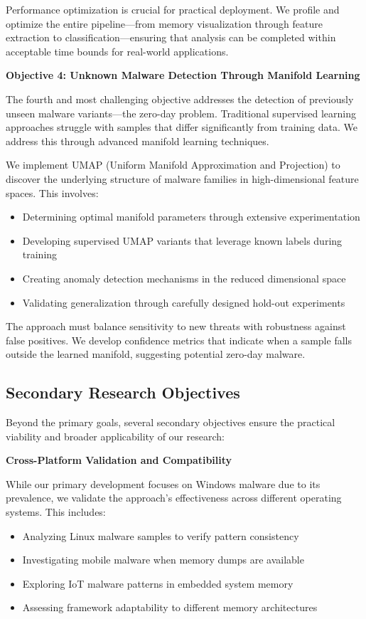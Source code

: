 Performance optimization is crucial for practical deployment. We profile and optimize the entire pipeline—from memory visualization through feature extraction to classification—ensuring that analysis can be completed within acceptable time bounds for real-world applications.

\textbf{Objective 4: Unknown Malware Detection Through Manifold Learning}

The fourth and most challenging objective addresses the detection of previously unseen malware variants—the zero-day problem. Traditional supervised learning approaches struggle with samples that differ significantly from training data. We address this through advanced manifold learning techniques.

We implement UMAP (Uniform Manifold Approximation and Projection) to discover the underlying structure of malware families in high-dimensional feature spaces. This involves:
\begin{itemize}
\item Determining optimal manifold parameters through extensive experimentation
\item Developing supervised UMAP variants that leverage known labels during training
\item Creating anomaly detection mechanisms in the reduced dimensional space
\item Validating generalization through carefully designed hold-out experiments
\end{itemize}

The approach must balance sensitivity to new threats with robustness against false positives. We develop confidence metrics that indicate when a sample falls outside the learned manifold, suggesting potential zero-day malware.

\subsection{Secondary Research Objectives}
\label{subsec:secondary_objectives}

Beyond the primary goals, several secondary objectives ensure the practical viability and broader applicability of our research:

\textbf{Cross-Platform Validation and Compatibility}

While our primary development focuses on Windows malware due to its prevalence, we validate the approach's effectiveness across different operating systems. This includes:
\begin{itemize}
\item Analyzing Linux malware samples to verify pattern consistency
\item Investigating mobile malware when memory dumps are available
\item Exploring IoT malware patterns in embedded system memory
\item Assessing framework adaptability to different memory architectures
\end{itemize}

